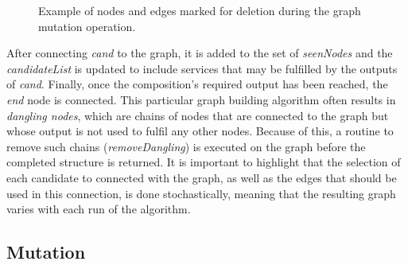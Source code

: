 \documentclass{article}
\begin{document}
\begin{figure}[h]
\centerline{
}
\caption{Example of nodes and edges marked for deletion during the graph mutation operation.}
\label{fig:mutationExample}
\end{figure}

After connecting
\textit{cand} to the graph, it is added to the set of \textit{seenNodes} and the \textit{candidateList} is updated to include services
that may be fulfilled by the outputs of \textit{cand}. Finally, once the composition's required output has been reached, the \textit{end}
node is connected. This particular graph building algorithm often results in \textit{dangling nodes}, which are chains of nodes that are
connected to the graph but whose output is not used to fulfil any other nodes. Because of this, a routine to remove such chains (\textit{removeDangling})
is executed on the graph before the completed structure is returned. It is important to highlight that the selection of each candidate
to connected with the graph, as well as the edges that should be used in this connection, is done stochastically, meaning that the
resulting graph varies with each run of the algorithm.

\subsection{Mutation}
\end{document}
